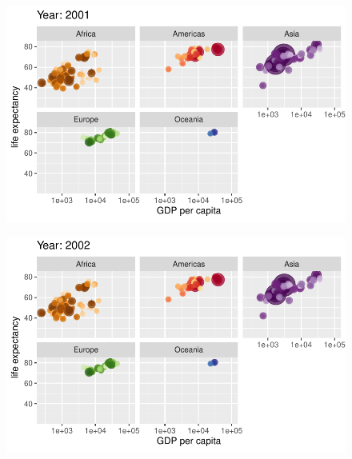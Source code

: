 \documentclass[
  letterpaper,
  DIV=11,
  numbers=noendperiod]{scrartcl}
\begin{document}
\begin{figure}[H]

{\centering \includegraphics{class05_files/figure-pdf/unnamed-chunk-24-90.pdf}

}

\end{figure}

\begin{figure}[H]

{\centering \includegraphics{class05_files/figure-pdf/unnamed-chunk-24-91.pdf}

}

\end{figure}
\end{document}
